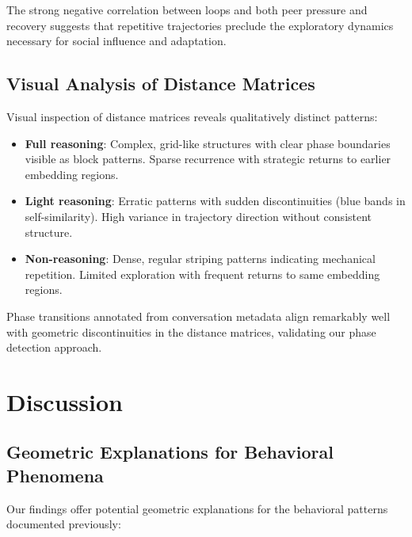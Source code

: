 \documentclass[11pt,letterpaper]{article}
\begin{document}
The strong negative correlation between loops and both peer pressure and recovery suggests that repetitive trajectories preclude the exploratory dynamics necessary for social influence and adaptation.

\subsection{Visual Analysis of Distance Matrices}

Visual inspection of distance matrices reveals qualitatively distinct patterns:

\begin{itemize}
\item \textbf{Full reasoning}: Complex, grid-like structures with clear phase boundaries visible as block patterns. Sparse recurrence with strategic returns to earlier embedding regions.
\item \textbf{Light reasoning}: Erratic patterns with sudden discontinuities (blue bands in self-similarity). High variance in trajectory direction without consistent structure.
\item \textbf{Non-reasoning}: Dense, regular striping patterns indicating mechanical repetition. Limited exploration with frequent returns to same embedding regions.
\end{itemize}

Phase transitions annotated from conversation metadata align remarkably well with geometric discontinuities in the distance matrices, validating our phase detection approach.

\section{Discussion}

\subsection{Geometric Explanations for Behavioral Phenomena}

Our findings offer potential geometric explanations for the behavioral patterns documented previously:
\end{document}
